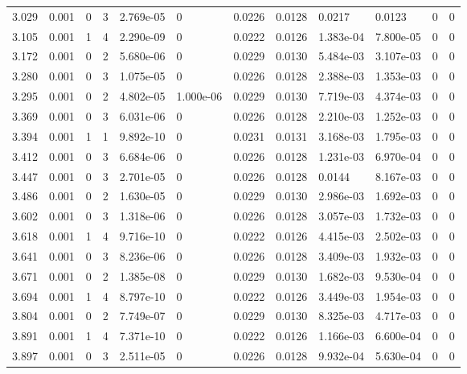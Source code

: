 \documentclass[preview]{standalone}
\begin{document}
{{{\begin{tabular}{L{1.2cm}C{1.2cm} C{0.3cm}C{0.5cm} C{1.4cm}C{1.4cm} C{1.4cm}C{1.4cm} C{1.6cm}C{1.6cm} C{1.6cm}C{1.6cm}}
  3.029  &  0.001  & 0     &  3 &  2.769e-05  & 0  &  0.0226&   0.0128& 0.0217 & 0.0123   &  0 & 0  \\ 
  3.105  &  0.001  & 1     &  4 &  2.290e-09  & 0  &  0.0222&   0.0126& 1.383e-04 & 7.800e-05   &  0 & 0  \\ 
  3.172  &  0.001  & 0     &  2 &  5.680e-06  & 0  &  0.0229&   0.0130& 5.484e-03 & 3.107e-03   &  0 & 0  \\ 
  3.280  &  0.001  & 0     &  3 &  1.075e-05  & 0  &  0.0226&   0.0128& 2.388e-03 & 1.353e-03   &  0 & 0  \\ 
  3.295  &  0.001  & 0     &  2 &  4.802e-05  & 1.000e-06  &  0.0229&   0.0130& 7.719e-03 & 4.374e-03   &  0 & 0  \\ 
  3.369  &  0.001  & 0     &  3 &  6.031e-06  & 0  &  0.0226&   0.0128& 2.210e-03 & 1.252e-03   &  0 & 0  \\ 
  3.394  &  0.001  & 1     &  1 &  9.892e-10  & 0  &  0.0231&   0.0131& 3.168e-03 & 1.795e-03   &  0 & 0  \\ 
  3.412  &  0.001  & 0     &  3 &  6.684e-06  & 0  &  0.0226&   0.0128& 1.231e-03 & 6.970e-04   &  0 & 0  \\ 
  3.447  &  0.001  & 0     &  3 &  2.701e-05  & 0  &  0.0226&   0.0128& 0.0144 & 8.167e-03   &  0 & 0  \\ 
  3.486  &  0.001  & 0     &  2 &  1.630e-05  & 0  &  0.0229&   0.0130& 2.986e-03 & 1.692e-03   &  0 & 0  \\ 
  3.602  &  0.001  & 0     &  3 &  1.318e-06  & 0  &  0.0226&   0.0128& 3.057e-03 & 1.732e-03   &  0 & 0  \\ 
  3.618  &  0.001  & 1     &  4 &  9.716e-10  & 0  &  0.0222&   0.0126& 4.415e-03 & 2.502e-03   &  0 & 0  \\ 
  3.641  &  0.001  & 0     &  3 &  8.236e-06  & 0  &  0.0226&   0.0128& 3.409e-03 & 1.932e-03   &  0 & 0  \\ 
  3.671  &  0.001  & 0     &  2 &  1.385e-08  & 0  &  0.0229&   0.0130& 1.682e-03 & 9.530e-04   &  0 & 0  \\ 
  3.694  &  0.001  & 1     &  4 &  8.797e-10  & 0  &  0.0222&   0.0126& 3.449e-03 & 1.954e-03   &  0 & 0  \\ 
  3.804  &  0.001  & 0     &  2 &  7.749e-07  & 0  &  0.0229&   0.0130& 8.325e-03 & 4.717e-03   &  0 & 0  \\ 
  3.891  &  0.001  & 1     &  4 &  7.371e-10  & 0  &  0.0222&   0.0126& 1.166e-03 & 6.600e-04   &  0 & 0  \\ 
  3.897  &  0.001  & 0     &  3 &  2.511e-05  & 0  &  0.0226&   0.0128& 9.932e-04 & 5.630e-04   &  0 & 0  \\ 

\end{tabular}}}}
\end{document}

